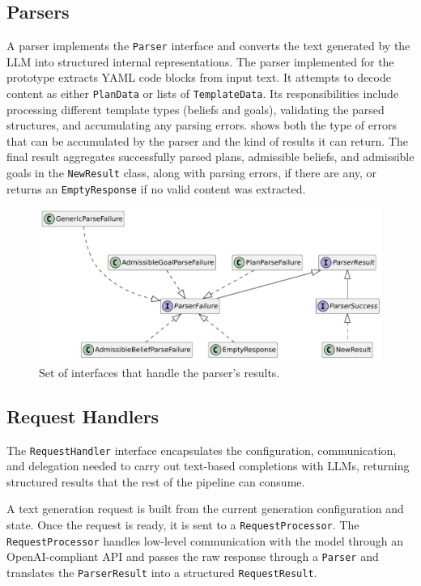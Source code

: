 \documentclass[12pt,a4paper,openright,twoside]{book}
\begin{document}
\subsection{Parsers}\label{sec:parsers}

A parser implements the \texttt{Parser} interface and converts the text generated by the \ac{LLM} into structured internal representations. 
%
The parser implemented for the prototype extracts YAML code blocks from input text.
%
It attempts to decode content as either \texttt{PlanData} or lists of \texttt{TemplateData}. 
%
Its responsibilities include processing different template types (beliefs and goals), validating the parsed structures, and accumulating any parsing errors.
%
 shows both the type of errors that can be accumulated by the parser and the kind of results it can return.
%
The final result aggregates successfully parsed plans, admissible beliefs, and admissible goals in the \texttt{NewResult} class, along with parsing errors, if there are any, or returns an \texttt{EmptyResponse} if no valid content was extracted.

\begin{figure}
    \centering
    \includegraphics[width=\textwidth]{figures/parser-result.pdf}
    \caption{Set of interfaces that handle the parser's results.}
    \label{fig:parser-result}
\end{figure}

\subsection{Request Handlers}\label{sec:request-handlers}

The \texttt{RequestHandler} interface encapsulates the configuration, communication, and delegation needed to carry out text-based completions with \acp{LLM}, returning structured results that the rest of the pipeline can consume.

A text generation request is built from the current generation configuration and state.
%
Once the request is ready, it is sent to a \texttt{RequestProcessor}.
%
The \texttt{RequestProcessor} handles low-level communication with the model through an OpenAI-compliant API and passes the raw response through a \texttt{Parser} and translates the \texttt{ParserResult} into a structured \texttt{RequestResult}.
\end{document}

